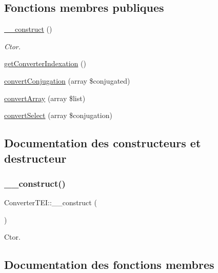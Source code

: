 \subsection*{Fonctions membres publiques}
\begin{DoxyCompactItemize}
\item 
\hyperlink{class_converter_t_e_i_a13a33009d3a4829179627836450ea31a}{\+\_\+\+\_\+construct} ()
\begin{DoxyCompactList}\small\item\em Ctor. \end{DoxyCompactList}\item 
\hyperlink{class_converter_t_e_i_a49fd33e0b0401c7bfaef1cca1bcee72c}{get\+Converter\+Indexation} ()
\item 
\hyperlink{class_converter_t_e_i_a33798e9ea3e043efe980706e39e160d4}{convert\+Conjugation} (array \$conjugated)
\item 
\hyperlink{class_converter_t_e_i_a3fcbf8ff1aa0399845dbec91faf17490}{convert\+Array} (array \$list)
\item 
\hyperlink{class_converter_t_e_i_abb47b4d3c4c9d0787064f23a368ffa6d}{convert\+Select} (array \$conjugation)
\end{DoxyCompactItemize}


\subsection{Documentation des constructeurs et destructeur}
\hypertarget{class_converter_t_e_i_a13a33009d3a4829179627836450ea31a}{}\label{class_converter_t_e_i_a13a33009d3a4829179627836450ea31a} 
\subsubsection{\texorpdfstring{\+\_\+\+\_\+construct()}{\_\_construct()}}
{\footnotesize\ttfamily Converter\+T\+E\+I\+::\+\_\+\+\_\+construct (\begin{DoxyParamCaption}{ }\end{DoxyParamCaption})}



Ctor. 



\subsection{Documentation des fonctions membres}
\hypertarget{class_converter_t_e_i_a3fcbf8ff1aa0399845dbec91faf17490}{}\label{class_converter_t_e_i_a3fcbf8ff1aa0399845dbec91faf17490} 
